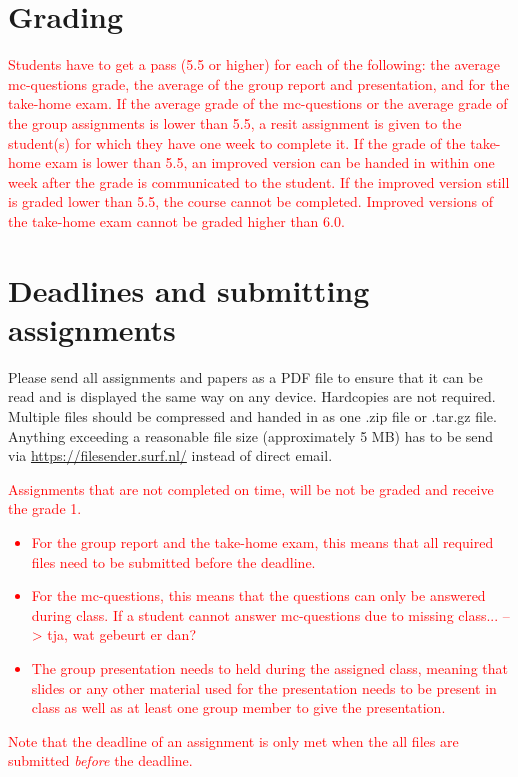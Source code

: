 \documentclass[a4paper,10pt,twocolumn]{report}
\begin{document}
	\section{Grading}
	\textcolor{red}{Students have to get a pass (5.5 or higher) for each of the following: the average mc-questions grade, the average of the group report and presentation, and for the take-home exam. If the average grade of the mc-questions or the average grade of the group assignments is lower than 5.5, a resit assignment is given to the student(s) for which they have one week to complete it. If the grade of the take-home exam is lower than 5.5, an improved version can be handed in within one week after the grade is communicated to the student. If the improved version still is graded lower than 5.5, the course cannot be completed. Improved versions of the take-home exam cannot be graded higher than 6.0.} 
	
	\section{Deadlines and submitting assignments}
	Please send all assignments and papers as a PDF file to ensure that it can be read and is displayed the same way on any device. Hardcopies are not required. Multiple files should be compressed and handed in as one .zip file or .tar.gz file. Anything exceeding a reasonable file size (approximately 5 MB) has to be send via \url{https://filesender.surf.nl/} instead of direct email. \\
	
	\textcolor{red}{Assignments that are not completed on time, will be not be graded and receive the grade 1. 
		\begin{itemize}
			\item For the group report and the take-home exam, this means that all required files need to be submitted before the deadline. 
			\item For the mc-questions, this means that the questions can only be answered during class. If a student cannot answer mc-questions due to missing class... --> tja, wat gebeurt er dan?
			\item The group presentation needs to held during the assigned class, meaning that slides or any other material used for the presentation needs to be present in class as well as at least one group member to give the presentation. 
		\end{itemize}
		Note that the deadline of an assignment is only met when the all files are submitted \emph{before} the deadline.}
\end{document}
